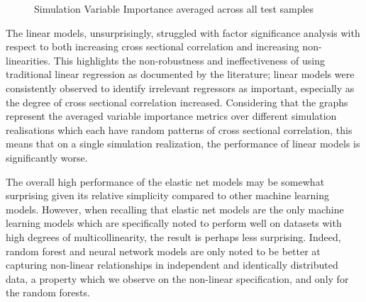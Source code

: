 \documentclass{article}
\begin{document}
\begin{landscape}
	\begin{figure}[!htb]
		\begin{center}
			\caption{Simulation Variable Importance averaged across all test samples}
		\end{center}
	\end{figure}
\end{landscape}

The linear models, unsurprisingly, struggled with factor significance analysis with respect to both increasing cross sectional correlation and increasing non-linearities. This highlights the non-robustness and ineffectiveness of using traditional linear regression as documented by the literature; linear models were consistently observed to identify irrelevant regressors as important, especially as the degree of cross sectional correlation increased. Considering that the graphs represent the averaged variable importance metrics over different simulation realisations which each have random patterns of cross sectional correlation, this means that on a single simulation realization, the performance of linear models is significantly worse.


The overall high performance of the elastic net models may be somewhat surprising given its relative simplicity compared to other machine learning models. However, when recalling that elastic net models are the only machine learning models which are specifically noted to perform well on datasets with high degrees of multicollinearity, the result is perhaps less surprising. Indeed, random forest and neural network models are only noted to be better at capturing non-linear relationships in independent and identically distributed data, a property which we observe on the non-linear specification, and only for the random forests.
\end{document}
